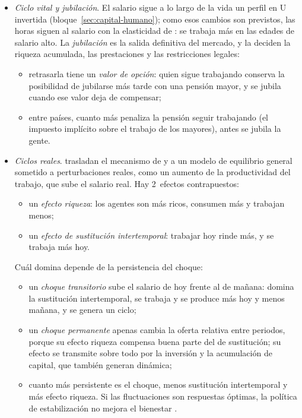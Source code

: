 \documentclass[11pt]{article}
\begin{document}
\begin{itemize}
\begin{itemize}
  \end{itemize}
\item \emph{Ciclo vital y jubilación}. El salario sigue a lo largo de la vida un perfil en U invertida (bloque~\ref{sec:capital-humano}); como esos cambios son previstos, las horas siguen al salario con la elasticidad de : se trabaja más en las edades de salario alto. La \emph{jubilación} es la salida definitiva del mercado, y la deciden la riqueza acumulada, las prestaciones y las restricciones legales:
  \begin{itemize}
  \item retrasarla tiene un \emph{valor de opción}: quien sigue trabajando conserva la posibilidad de jubilarse más tarde con una pensión mayor, y se jubila cuando ese valor deja de compensar\nocite{StockWise1990Pensions};
  \item entre países, cuanto más penaliza la pensión seguir trabajando (el impuesto implícito sobre el trabajo de los mayores), antes se jubila la gente\nocite{GruberWise1999Social}.
  \end{itemize}
\item \emph{Ciclos reales}. \textcite{KydlandPrescott1982Time} trasladan el mecanismo de  y  a un modelo de equilibrio general sometido a perturbaciones reales, como un aumento de la productividad del trabajo, que sube el salario real. Hay 2~efectos contrapuestos:
  \begin{itemize}
  \item un \emph{efecto riqueza}: los agentes son más ricos, consumen más y trabajan menos;
  \item un \emph{efecto de sustitución intertemporal}: trabajar hoy rinde más, y se trabaja más hoy.
  \end{itemize}
  Cuál domina depende de la persistencia del choque:
  \begin{itemize}
  \item un \emph{choque transitorio} sube el salario de hoy frente al de mañana: domina la sustitución intertemporal, se trabaja y se produce más hoy y menos mañana, y se genera un ciclo;
  \item un \emph{choque permanente} apenas cambia la oferta relativa entre periodos, porque su efecto riqueza compensa buena parte del de sustitución; su efecto se transmite sobre todo por la inversión y la acumulación de capital, que también generan dinámica;
  \item cuanto más persistente es el choque, menos sustitución intertemporal y más efecto riqueza. Si las fluctuaciones son respuestas óptimas, la política de estabilización no mejora el bienestar .

\end{itemize}
\end{itemize}
\end{document}
